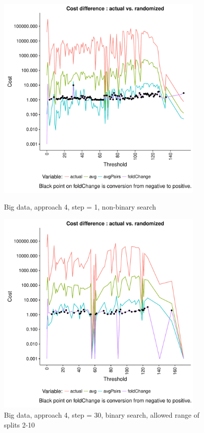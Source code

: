 \documentclass[a4paper,10pt]{article}
\theoremstyle{plain}
\theoremstyle{definition}
\begin{document}
\begin{figure}[H]
	\centering
	\begin{minipage}{0.80\textwidth}
		\centering
		\includegraphics[width=0.9\textwidth]{./plots/plotCostGap/plotCostGapBigDataAp4Step1K5Seed42NoBinary.pdf}
		\caption{Big data, approach 4, step = 1, non-binary search}
		\label{fig:hcMaxGapBigDataAp4Step1NoBinary}
	\end{minipage}
	\begin{minipage}{0.80\textwidth}
		\centering
		\includegraphics[width=0.9\textwidth]{./plots/plotCostGap/plotCostGapBigDataAp4Step30K5Seed42Binary.pdf}
		\caption{Big data, approach 4, step = 30, binary search, allowed range of splits 2-10}
		\label{fig:hcMaxGapBigDataAp4Step30Binary}
	\end{minipage}
\end{figure}
\end{document}

